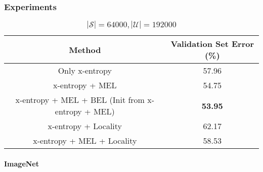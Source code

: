 \begin{frame}
	\frametitle{Experiments}
	\begin{table}
		\centering
		\resizebox{\textwidth}{!}
		{
		\begin{tabular}{|c|c|}
			\hline
			\textbf{Method} & Validation Set Error (\%)\\
			\hline
			Only x-entropy & 57.96\\
			x-entropy + MEL & 54.75\\
			x-entropy + MEL + BEL (Init from x-entropy + MEL) & \textbf{53.95}\\
			\hline
			x-entropy + Locality & 62.17\\
			x-entropy + MEL + Locality & 58.53\\
			\hline
		\end{tabular}
		}
		\vspace{-8pt}
		\caption{\tiny{$|\mathcal{S}| = 64000, |\mathcal{U}| = 192000$}}
	\end{table}
	\framesubtitle{ImageNet}
\end{frame}

